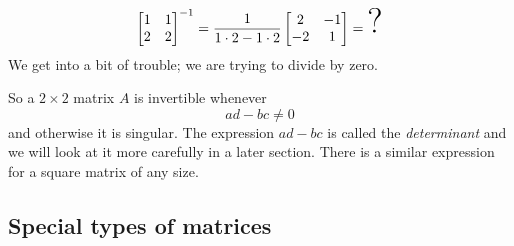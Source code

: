\documentclass{ximera}
\begin{document}
\begin{equation*}
    \begin{bmatrix}
        1 & 1 \\
        2 & 2
    \end{bmatrix}^{-1}
    = \frac{1}{1\cdot 2-1 \cdot 2}
    \begin{bmatrix}
        2 & -1 \\
        -2 & 1
    \end{bmatrix}
    =
    \text{\Huge ?}
\end{equation*}
We get into a bit of trouble; we are trying to divide by zero.

So a $2 \times 2$ matrix $A$ is invertible whenever
\begin{equation*}
    ad - bc \not= 0
\end{equation*}
and otherwise it is singular.  The expression $ad-bc$ is called the \emph{determinant} and we will look at it more carefully in a later section. There is a similar expression for a square matrix of any size.

\subsection{Special types of matrices}
\end{document}
